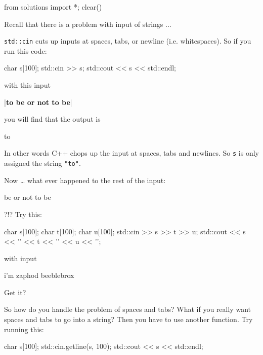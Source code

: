 \begin{python0}
from solutions import *; clear()
\end{python0}

Recall that there is a problem with input of strings ...

\texttt{std::cin} cuts up inputs at spaces, tabs, or newline (i.e. whitespaces). So if you run this code:

\begin{consolethree}[escapeinside=||]
char s[100];
std::cin >> s;
std::cout << s << std::endl;
\end{consolethree}

with this input

\begin{consolethree}[escapeinside=||]
|\textbf{to be or not to be}|
\end{consolethree}

you will find that the output is

\begin{console}
to
\end{console}

In other words C++ chops up the input at spaces, tabs and newlines. So \texttt{s} is only assigned the string \texttt{"to"}.

Now \ldots{} what ever happened to the rest of the input:

\begin{console}
be or not to be
\end{console}

?!? Try this:

\begin{consolethree}[escapeinside=||]
char s[100];
char t[100];
char u[100];
std::cin >> s >> t >> u;
std::cout << s << '\n' << t << '\n' << u << '\n';
\end{consolethree}

with input

\begin{consolethree}[escapeinside=||]
i'm zaphod beeblebrox
\end{consolethree}

Get it?


So how do you handle the problem of spaces and tabs? What if you really want spaces and tabs to go into a string? Then you have to use another function. Try running this:

\begin{consolethree}[escapeinside=||]
char s[100];
std::cin.getline(s, 100);
std::cout << s << std::endl;
\end{consolethree}

